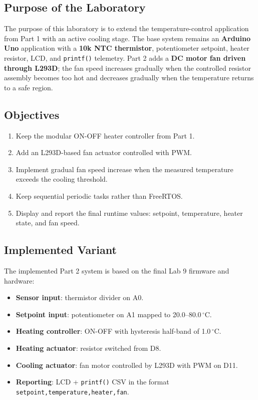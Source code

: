 \documentclass[12pt]{article}
\begin{document}
\subsection*{Purpose of the Laboratory}
\hspace{0.8cm} The purpose of this laboratory is to extend the temperature-control application from Part 1 with an active cooling stage. The base system remains an \textbf{Arduino Uno} application with a \textbf{10k NTC thermistor}, potentiometer setpoint, heater resistor, LCD, and \texttt{printf()} telemetry. Part 2 adds a \textbf{DC motor fan driven through L293D}; the fan speed increases gradually when the controlled resistor assembly becomes too hot and decreases gradually when the temperature returns to a safe region.

\subsection*{Objectives}
\begin{enumerate}
    \item Keep the modular ON-OFF heater controller from Part 1.
    \item Add an L293D-based fan actuator controlled with PWM.
    \item Implement gradual fan speed increase when the measured temperature exceeds the cooling threshold.
    \item Keep sequential periodic tasks rather than FreeRTOS.
    \item Display and report the final runtime values: setpoint, temperature, heater state, and fan speed.
\end{enumerate}

\subsection*{Implemented Variant}
\hspace{0.8cm} The implemented Part 2 system is based on the final Lab 9 firmware and hardware:
\begin{itemize}
    \item \textbf{Sensor input}: thermistor divider on A0.
    \item \textbf{Setpoint input}: potentiometer on A1 mapped to 20.0--80.0\,$^{\circ}$C.
    \item \textbf{Heating controller}: ON-OFF with hysteresis half-band of 1.0\,$^{\circ}$C.
    \item \textbf{Heating actuator}: resistor switched from D8.
    \item \textbf{Cooling actuator}: fan motor controlled by L293D with PWM on D11.
    \item \textbf{Reporting}: LCD + \texttt{printf()} CSV in the format \texttt{setpoint,temperature,heater,fan}.
\end{itemize}
\end{document}
